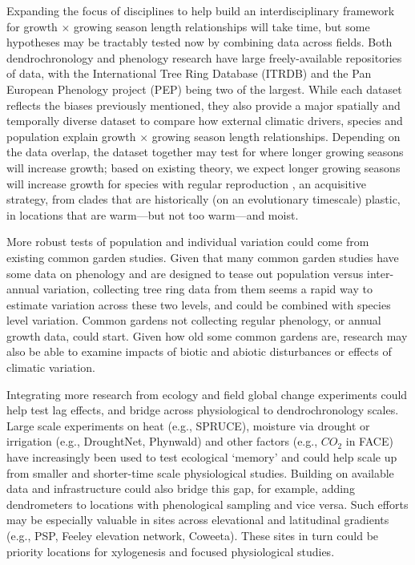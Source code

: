 \documentclass[11pt]{article}
\begin{document}
Expanding the focus of disciplines to help build an interdisciplinary framework for growth $\times$ growing season length relationships will take time, but some hypotheses may be tractably tested now by combining data across fields. Both dendrochronology and phenology research have large freely-available repositories of data, with the International Tree Ring Database (ITRDB) and the Pan European Phenology project (PEP) being two of the largest. While each dataset reflects the biases previously mentioned, they also provide a major spatially and temporally diverse dataset to compare how external climatic drivers, species and population explain growth $\times$ growing season length relationships. Depending on the data overlap, the dataset together may test for where longer growing seasons will increase growth; based on existing theory, we expect longer growing seasons will increase growth for species with regular reproduction \citep[no masting, see also][]{hacket2022mastree+}, an acquisitive strategy, from clades that are historically (on an evolutionary timescale) plastic, in locations that are warm---but not too warm---and moist. %

More robust tests of population and individual variation could come from existing common garden studies. Given that many common garden studies have some data on phenology and are designed to tease out population versus inter-annual variation, collecting tree ring data from them seems a rapid way to estimate variation across these two levels, and could be combined with species level variation. Common gardens not collecting regular phenology, or annual growth data, could start. Given how old some common gardens are, research may also be able to examine impacts of biotic and abiotic disturbances or effects of climatic variation. 

Integrating more research from ecology and field global change experiments could help test lag effects, and bridge across physiological to dendrochronology scales. Large scale experiments on heat (e.g., SPRUCE), moisture via drought or irrigation (e.g., DroughtNet, Phynwald) and other factors (e.g., $CO_2$ in FACE) have increasingly been used to test ecological `memory' and could help scale up from smaller and shorter-time scale physiological studies. Building on available data and infrastructure could also bridge this gap, for example, adding dendrometers to locations with phenological sampling and vice versa. Such efforts may be especially valuable in sites across elevational and latitudinal gradients (e.g., PSP, Feeley elevation network, Coweeta). These sites in turn could be priority locations for xylogenesis and focused physiological studies. 
\end{document}
